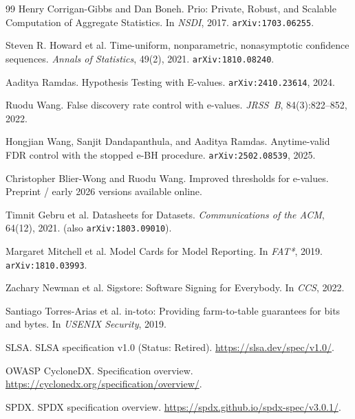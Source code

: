 \documentclass[11pt]{article}
\begin{document}
\begin{thebibliography}{99}
Henry Corrigan-Gibbs and Dan Boneh.
\newblock Prio: Private, Robust, and Scalable Computation of Aggregate Statistics.
\newblock In \emph{NSDI}, 2017.\; \texttt{arXiv:1703.06255}.

Steven R. Howard et al.
\newblock Time-uniform, nonparametric, nonasymptotic confidence sequences.
\newblock \emph{Annals of Statistics}, 49(2), 2021.\; \texttt{arXiv:1810.08240}.

Aaditya Ramdas.
\newblock Hypothesis Testing with E-values.
\newblock \texttt{arXiv:2410.23614}, 2024.

Ruodu Wang.
\newblock False discovery rate control with e-values.
\newblock \emph{JRSS~B}, 84(3):822--852, 2022.

Hongjian Wang, Sanjit Dandapanthula, and Aaditya Ramdas.
\newblock Anytime-valid FDR control with the stopped e-BH procedure.
\newblock \texttt{arXiv:2502.08539}, 2025.

Christopher Blier-Wong and Ruodu Wang.
\newblock Improved thresholds for e-values.
\newblock Preprint / early 2026 versions available online.

Timnit Gebru et al.
\newblock Datasheets for Datasets.
\newblock \emph{Communications of the ACM}, 64(12), 2021.\; (also \texttt{arXiv:1803.09010}).

Margaret Mitchell et al.
\newblock Model Cards for Model Reporting.
\newblock In \emph{FAT*}, 2019.\; \texttt{arXiv:1810.03993}.

Zachary Newman et al.
\newblock Sigstore: Software Signing for Everybody.
\newblock In \emph{CCS}, 2022.

Santiago Torres-Arias et al.
\newblock in-toto: Providing farm-to-table guarantees for bits and bytes.
\newblock In \emph{USENIX Security}, 2019.

SLSA.
\newblock SLSA specification v1.0 (Status: Retired).
\newblock \url{https://slsa.dev/spec/v1.0/}.

OWASP CycloneDX.
\newblock Specification overview.
\newblock \url{https://cyclonedx.org/specification/overview/}.

SPDX.
\newblock SPDX specification overview.
\newblock \url{https://spdx.github.io/spdx-spec/v3.0.1/}.


\end{thebibliography}
\end{document}
